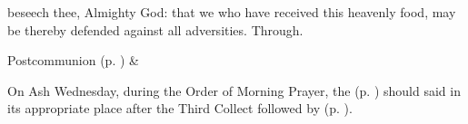 \postcommunion
{} beseech thee, Almighty God: that we who have received this heavenly food, may be thereby defended against all adversities. Through.


\begin{rubric}
     Postcommunion  (p. \pageref{SPSaints}) \&  
\end{rubric}


\clearpage


\par\noindent
\begin{rubric}
    On Ash Wednesday, during the Order of Morning Prayer, the  (p. \pageref{litany}) should said in its appropriate place after the Third Collect followed by  (p. \pageref{penitential}).
\end{rubric}

\vspace{-1\baselineskip}

